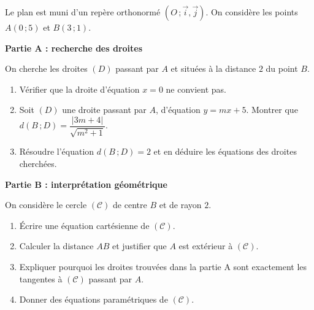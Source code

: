 \documentclass[11pt]{article}
\begin{document}
\begin{exercice}
Le plan est muni d'un repère orthonormé $(O\,;\vec{i},\vec{j})$. On considère les points $A(0\,;5)$ et $B(3\,;1)$.

\textbf{Partie A : recherche des droites}

On cherche les droites $(D)$ passant par $A$ et situées à la distance $2$ du point $B$.
\begin{enumerate}
\item Vérifier que la droite d'équation $x = 0$ ne convient pas.
\item Soit $(D)$ une droite passant par $A$, d'équation $y = mx + 5$. Montrer que $d(B\,;D) = \dfrac{|3m + 4|}{\sqrt{m^2 + 1}}$.
\item Résoudre l'équation $d(B\,;D) = 2$ et en déduire les équations des droites cherchées.
\end{enumerate}

\textbf{Partie B : interprétation géométrique}

On considère le cercle $(\mathscr{C})$ de centre $B$ et de rayon $2$.
\begin{enumerate}
\item Écrire une équation cartésienne de $(\mathscr{C})$.
\item Calculer la distance $AB$ et justifier que $A$ est extérieur à $(\mathscr{C})$.
\item Expliquer pourquoi les droites trouvées dans la partie A sont exactement les tangentes à $(\mathscr{C})$ passant par $A$.
\item Donner des équations paramétriques de $(\mathscr{C})$.
\end{enumerate}
\end{exercice}
\end{document}
